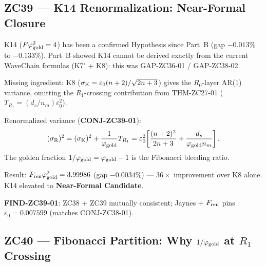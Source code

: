 \documentclass[11pt, a4paper]{article}
\newcommand{\phig}{\varphi_{\rm gold}}
\newcommand{\sigmaK}{\sigma_{\rm K}}
\newcommand{\sigmaR}{\sigma_{\rm R}}
\newcommand{\TR}{T_{R_1}}
\begin{document}
\subsection{ZC39 --- K14 Renormalization: Near-Formal Closure}

\begin{zcbox}[title={ZC39: CONJ-ZC39-01 --- $F_{\rm ren}\phig^2 = 3.99986$; K14 Near-Formal}]
\sloppy
K14 ($F\phig^2 = 4$) has been a confirmed Hypothesis since Part~B
(gap $-0.013\%$ to $-0.133\%$). Part~B showed K14 cannot be derived
exactly from the current WaveChain formulas (K7$'$ + K8): this was
GAP-ZC36-01 / GAP-ZC38-02.

Missing ingredient: K8 ($\sigmaK = \varepsilon_0(n+2)/\sqrt{2n+3}$)
gives the $R_0$-layer AR(1) variance, omitting the $R_1$-crossing
contribution from THM-ZC27-01 ($\TR = (d_s/n_m)\varepsilon_0^2$).

Renormalized variance (\textbf{CONJ-ZC39-01}):
\[
  (\sigmaR)^2 = (\sigmaK)^2 + \frac{1}{\phig}\TR
  = \varepsilon_0^2\!\left[\frac{(n+2)^2}{2n+3} + \frac{d_s}{\phig n_m}\right].
\]
The golden fraction $1/\phig = \phig - 1$ is the Fibonacci bleeding ratio.

Result: $F_{\rm ren}\phig^2 = 3.99986$ (gap $-0.0034\%$) --- $36\times$
improvement over K8 alone. K14 elevated to \textbf{Near-Formal Candidate}.

\textbf{FIND-ZC39-01}: ZC38 + ZC39 mutually consistent; Jaynes +
$F_{\rm ren}$ pins $\varepsilon_0 = 0.007599$ (matches CONJ-ZC38-01).
\end{zcbox}

\subsection{ZC40 --- Fibonacci Partition: Why $1/\phig$ at $R_1$ Crossing}
\end{document}
